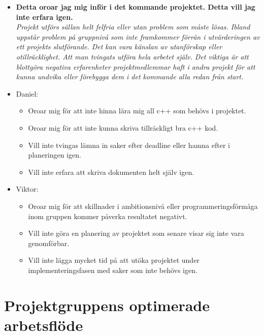 \documentclass{mall}
\begin{document}
\begin{itemize}
\item \textbf{Detta oroar jag mig inför i det kommande projektet. Detta vill jag inte erfara igen.}
  \\\emph{ Projekt utförs sällan helt felfria eller utan problem som måste lösas. Ibland uppstår problem på gruppnivå som inte framkommer förrän i utvärderingen av ett projekts slutförande. Det kan vara känslan av utanförskap eller otillräcklighet. Att man tvingats utföra hela arbetet själv. Det viktiga är att blottgöra negativa erfarenheter projektmedlemmar haft i andra projekt för att kunna undvika eller förebygga dem i det kommande alla redan från start. }

\item Daniel:
  \begin{itemize}
  \item Oroar mig för att inte hinna lära mig all c++ som behövs i projektet.
  \item Oroar mig för att inte kunna skriva tillräckligt bra c++ kod.
  \item Vill inte tvingas lämna in saker efter deadline eller hamna efter i planeringen igen.
  \item Vill inte erfara att skriva dokumenten helt själv igen.
  \end{itemize}


\item Viktor:
  \begin{itemize}
  \item Oroar mig för att skillnader i ambitionsnivå eller programmeringsförmåga inom gruppen kommer påverka resultatet negativt.
  \item Vill inte göra en planering av projektet som senare visar sig inte vara genomförbar.
  \item Vill inte lägga mycket tid på att utöka projektet under implementeringsfasen med saker som inte behövs igen.
  \end{itemize}
  
\end{itemize}

\section{Projektgruppens optimerade arbetsflöde}
\end{document}
